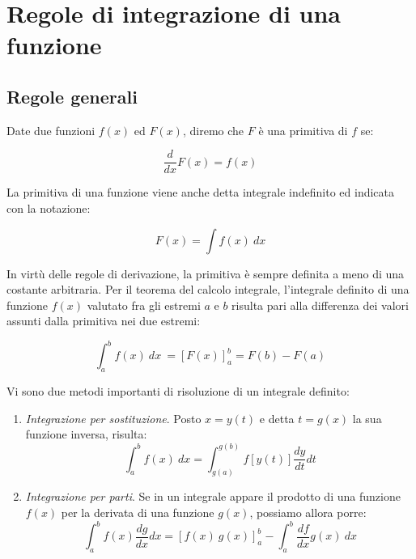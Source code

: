\section{Regole di integrazione di una funzione}

\subsection*{Regole generali}

Date due funzioni $\displaystyle f( x)$ ed $\displaystyle F( x)$, diremo che $\displaystyle F$ è una primitiva di $\displaystyle f$ se:

\begin{equation*}
	\frac{d}{dx} F(x) =f(x)
\end{equation*}

La primitiva di una funzione viene anche detta integrale indefinito ed indicata con la notazione:

\begin{equation*}
	F(x) =\int f(x) \ dx
\end{equation*}

In virtù delle regole di derivazione, la primitiva è sempre definita a meno di una costante arbitraria. Per il teorema del calcolo integrale, l'integrale definito di una funzione $\displaystyle f( x)$ valutato fra gli estremi $\displaystyle a$ e $\displaystyle b$ risulta pari alla differenza dei valori assunti dalla primitiva nei due estremi:

\begin{equation*}
	\int^b_a f( x) \ dx\ =[ F( x)]^b_a =F( b) -F( a)
\end{equation*}

Vi sono due metodi importanti di risoluzione di un integrale definito:

\begin{enumerate}
	\item \textit{Integrazione per sostituzione}. Posto $\displaystyle x=y( t)$ e detta $\displaystyle t=g( x)$ la sua funzione inversa, risulta:
	\[
		\int^b_a f( x) \ dx=\int^{g( b)}_{g( a)} f[ y( t)]\frac{dy}{dt} dt
	\]
	\item \textit{Integrazione per parti}. Se in un integrale appare il prodotto di una funzione $\displaystyle f( x)$ per la derivata di una funzione $\displaystyle g( x)$, possiamo allora porre:
	\[
		\int^b_a f( x)\frac{dg}{dx} dx=[ f( x) \ g( x)]^b_a -\int^b_a\frac{df}{dx} g( x) \ dx
	\]
\end{enumerate}

